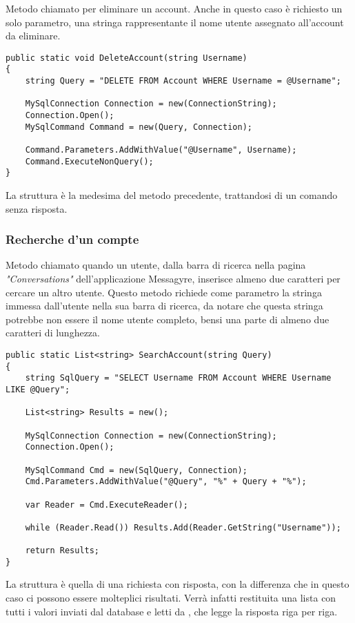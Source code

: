 \documentclass{article}
\begin{document}
Metodo chiamato per eliminare un account. Anche in questo caso è richiesto un solo parametro, una stringa  rappresentante il nome utente assegnato all'account da eliminare. 

\begin{verbatim}
public static void DeleteAccount(string Username)
{
	string Query = "DELETE FROM Account WHERE Username = @Username";
	
	MySqlConnection Connection = new(ConnectionString);
	Connection.Open();
	MySqlCommand Command = new(Query, Connection);
	
	Command.Parameters.AddWithValue("@Username", Username);
	Command.ExecuteNonQuery();
}
\end{verbatim}

La struttura è la medesima del metodo precedente, trattandosi di un comando senza risposta.

\subsubsection{Recherche d'un compte}

Metodo chiamato quando un utente, dalla barra di ricerca nella pagina \textit{"Conversations"} dell'applicazione Messagyre, inserisce almeno due caratteri per cercare un altro utente.
Questo metodo richiede come parametro la stringa immessa dall'utente nella sua barra di ricerca, da notare che questa stringa potrebbe non essere il nome utente completo, bensi una parte di almeno due caratteri di lunghezza.

\begin{verbatim}
public static List<string> SearchAccount(string Query)
{
	string SqlQuery = "SELECT Username FROM Account WHERE Username LIKE @Query";
	
	List<string> Results = new();
	
	MySqlConnection Connection = new(ConnectionString);
	Connection.Open();
	
	MySqlCommand Cmd = new(SqlQuery, Connection);
	Cmd.Parameters.AddWithValue("@Query", "%" + Query + "%");
	
	var Reader = Cmd.ExecuteReader();
	
	while (Reader.Read()) Results.Add(Reader.GetString("Username"));
	
	return Results;
}
\end{verbatim}

La struttura è quella di una richiesta con risposta, con la differenza che in questo caso ci possono essere molteplici risultati. Verrà infatti restituita una lista  con tutti i valori inviati dal database e letti da , che legge la risposta riga per riga.
\end{document}
